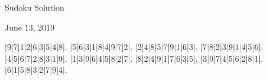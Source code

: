 \documentclass{article}
\begin{document}
\begin{center}
\Huge{Sudoku Solution}
\end{center}
\begin{center}
\Large{June 13, 2019}
\end{center}
\begin{sudoku}
|9|7|1|2|6|3|5|4|8|.
|5|6|3|1|8|4|9|7|2|.
|2|4|8|5|7|9|1|6|3|.
|7|8|2|3|9|1|4|5|6|.
|4|5|6|7|2|8|3|1|9|.
|1|3|9|6|4|5|8|2|7|.
|8|2|4|9|1|7|6|3|5|.
|3|9|7|4|5|6|2|8|1|.
|6|1|5|8|3|2|7|9|4|.
\end{sudoku}
\end{document}
